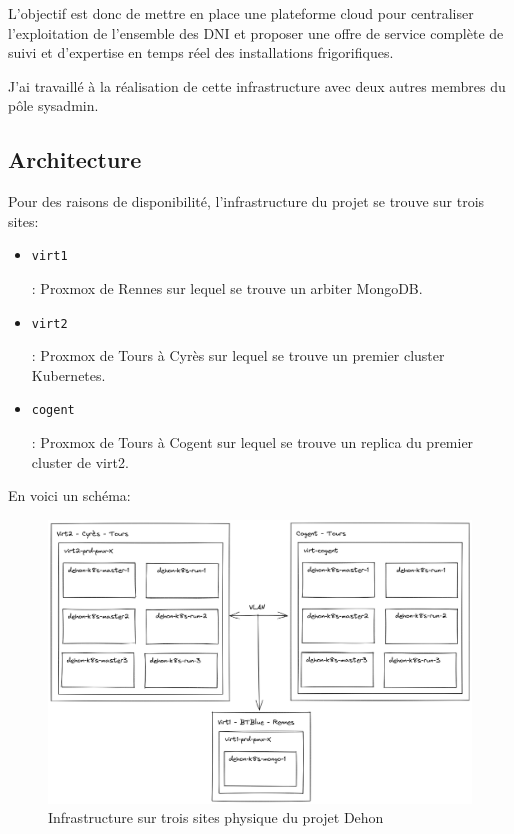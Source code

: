 \documentclass[12pt, a4paper, twoside]{article}
\begin{document}
L'objectif est donc de mettre en place une plateforme cloud pour centraliser l'exploitation de l'ensemble des \gls{DNI} et proposer une offre de service complète de suivi et d'expertise en temps réel des installations frigorifiques.

J'ai travaillé à la réalisation de cette infrastructure avec deux autres membres du pôle sysadmin.

\subsection{Architecture}
Pour des raisons de disponibilité, l'infrastructure du projet se trouve sur trois sites:
\begin{itemize}
    \item \begin{code}\texttt{virt1}\end{code}: \gls{Proxmox} de Rennes sur lequel se trouve un arbiter MongoDB. 
    \item \begin{code}\texttt{virt2}\end{code}: \gls{Proxmox} de Tours à Cyrès sur lequel se trouve un premier \gls{cluster} \gls{Kubernetes}.
    \item \begin{code}\texttt{cogent}\end{code}: \gls{Proxmox} de Tours à Cogent sur lequel se trouve un replica du premier \gls{cluster} de virt2.
\end{itemize}

\newpage
En voici un schéma:
\begin{figure}[!ht]
    \centering
        \includegraphics[width=\textwidth]{src/graph_dehon1.png}
    \caption{Infrastructure sur trois sites physique du projet Dehon}
    \label{fig:graph_dehon1}
\end{figure}
\end{document}
